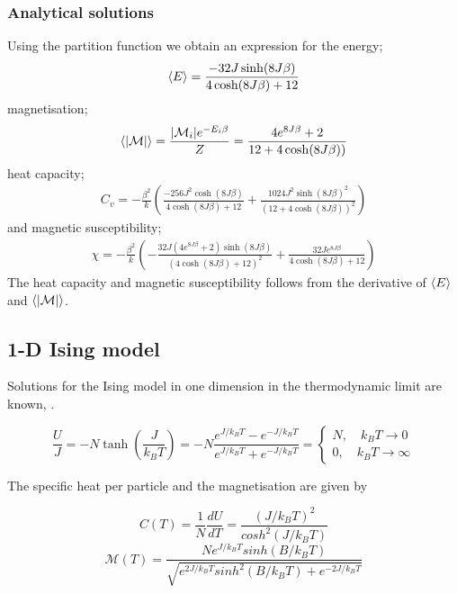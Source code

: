 \documentclass[11pt,a4paper,final]{article}
\numberwithin{equation}{section}
\newcommand{\magM}{\mathcal{M}}
\begin{document}
\subsubsection{Analytical solutions}
Using the partition function we obtain an expression for the energy;
\begin{gather}
\expval{E} = \frac{-32J\sinh(8J\beta)}{4\cosh(8J\beta)+12}
\end{gather}
magnetisation;
\begin{gather}
\expval{\abs{\magM}} = \frac{\abs{\magM_i}e^{-E_i\beta}}{Z}
= \frac{4e^{8J\beta} + 2}{12+4\cosh(8J\beta))}
\label{eq:absM}
\end{gather}
heat capacity;
\begin{gather}
C_v = -\frac{\beta^2}{k}\left(\frac{-256J^2\cosh(8J\beta)}{4\cosh(8J\beta) + 12}
 + \frac{1024J^2\sinh(8J\beta)^2}{(12+4\cosh(8J\beta))^2}\right)
\end{gather}
and magnetic susceptibility;
\begin{gather}
\chi = -\frac{\beta^2}{k}\left(- \frac{32 J \left(4 e^{8 J \beta} + 2\right) \sinh{\left (8 J \beta \right )}}{
\left(4 \cosh{\left (8 J \beta \right )} + 12\right)^{2}} 
+ \frac{32 J e^{8 J \beta}}{4 \cosh(8 J \beta) + 12}\right)
\end{gather}
The heat capacity and magnetic susceptibility follows from the derivative 
of $\expval{E}$ and $\expval{\abs{\magM}}$.

\subsection{1-D Ising model}
Solutions for the Ising model in one dimension in the 
thermodynamic limit are known, \cite{PB94}. 

\begin{equation}
\frac{U}{J} = -N \tanh \left( \frac{J}{k_B T} \right) = -N \frac{e^{J/k_B T}-e^{-J/k_B T} }{e^{J/k_B T}+ e^{-J/k_B T} } =  \begin{cases} N, \quad k_B T \to 0 \\ 0, \quad  k_B T \to \infty \end{cases}
\end{equation}

The specific heat per particle and the magnetisation are given by 

\begin{equation}
C(T) = \frac{1}{N} \frac{dU}{dT} = \frac{(J/k_B T)^2}{cosh^2 (J/k_B T)}
\end{equation}
\begin{equation}
\magM(T) = \frac{N e^{J / k_B T} sinh(B/k_B T) }{ \sqrt{ e^{2J/k_B T} sinh^2 (B/k_B T) + e^{-2J/ k_B T}  } }
\end{equation}
\end{document}

